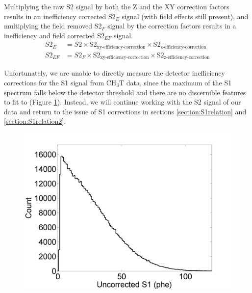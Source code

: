 Multiplying the raw S2 signal by both the Z and the XY correction factors results in an inefficiency corrected S2$_E$ signal (with field effects still present), and multiplying the field removed S2$_F$ signal by the correction factors results in a inefficiency and field corrected S2$_{EF}$ signal.
\begin{align}
S2_E &=S2 \times \mbox{S}2_{\mbox{xy-efficiency-correction}} \times \mbox{S}2_{\mbox{z-efficiency-correction}} \label{E_eq}\\
S2_{EF} &=S2_F \times \mbox{S}2_{\mbox{xy-efficiency-correction}} \times \mbox{S}2_{\mbox{z-efficiency-correction}} 
\label{EF_eq}
\end{align}

Unfortunately, we are unable to directly measure the detector inefficiency corrections for the S1 signal from CH$_3$T data, since the maximum of the S1 spectrum falls below the detector threshold and there are no discernible features to fit to (Figure \ref{fig:S1thresholded}). Instead, we will continue working with the S2 signal of our data and return to the issue of S1 corrections in sections \ref{section:S1relation} and \ref{section:S1relation2}.


\begin{figure}[!h]
\includegraphics[scale=0.5]{Run04Corrections/CH3T_S1_Threshold.png}
\label{fig:S1thresholded}
\end{figure}


